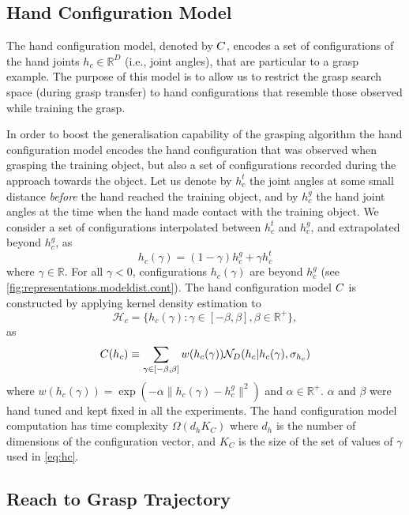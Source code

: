 \subsection{Hand Configuration Model}

The hand configuration model, denoted by $C$, encodes a set of configurations of the hand joints $h_c \in \mathbb R^D$ (i.e., joint angles), that are particular to a grasp example. The purpose of this model is to allow us to restrict the grasp search space (during grasp transfer) to hand configurations that resemble those observed while training the grasp.

In order to boost the generalisation capability of the grasping algorithm the hand configuration model encodes the hand configuration that was observed when grasping the training object, but also a set of configurations recorded during the approach towards the object. Let us denote by $h^t_c$ the joint angles at some small distance \emph{before} the hand reached the training object, and by $h^g_c$ the hand joint angles at the time when the hand made contact with the training object. We consider a set of configurations interpolated between $h^t_c$ and $h^g_c$, and extrapolated beyond $h^g_c$, as
\begin{equation}
h_c(\gamma) = (1 - \gamma)h^g_c + \gamma h^t_c
\label{eq:learning.configmodel.config}
\end{equation}
\noindent where $\gamma \in \mathbb R$. For all $\gamma < 0$, configurations $h_c(\gamma)$ are beyond $h^g_c$ (see \fig\ref{fig:representations.modeldist.cont}). The hand configuration model $C$ is constructed by applying kernel density estimation to \begin{equation}\label{eq:H_c}\mathcal H_c = \lbrace h_c(\gamma): \gamma \in [-\beta, \beta], \beta \in \mathbb R^{+}\rbrace,\end{equation} as 
\begin{equation}
C(h_c) \equiv \sum_{\gamma \in [-\beta, \beta]} w({h_c(\gamma)}) \mathcal{N}_D(h_c|h_c(\gamma), \sigma_{h_c}) 
\label{eq:hc}
\end{equation}
where  $w({h_c(\gamma)}) = \exp(-\alpha \|h_c(\gamma) - h^g_c \|^2)$ and $\alpha \in \mathbb R^{+}$. $\alpha$ and $\beta$ were hand tuned and kept fixed in all the experiments. The hand configuration model computation has time complexity $\Omega(d_h K_C)$ where $d_h$ is the number of dimensions of the configuration vector, and $K_C$ is the size of the set of values of $\gamma$ used in \eq\eqref{eq:hc}.

\subsection{Reach to Grasp Trajectory}


